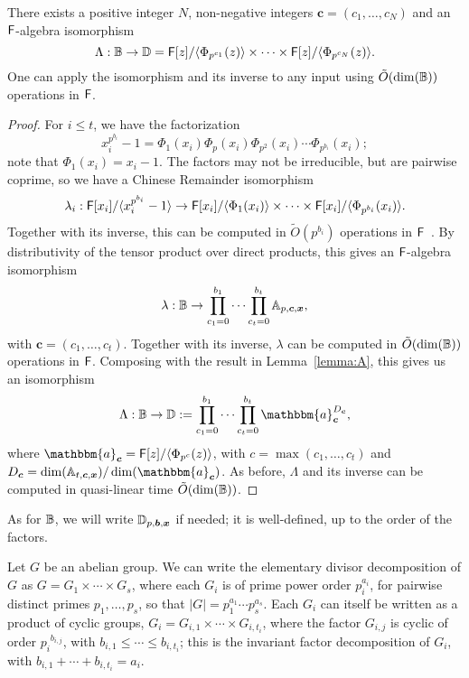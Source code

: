 \begin{lemma}\label{lemma:alg}
  There exists a positive integer $N$, non-negative integers
  $\boldsymbol{c}=(c_1,\dots,c_N)$ and  an
  ${\mathsf{F}}$-algebra isomorphism 
  $$\Lambda: \mathbb{B} \to \mathbb{D}= {\mathsf{F}}[z]/\langle \Phi_{p^{c_1}}(z) \rangle \times \cdots \times {\mathsf{F}}[z]/\langle \Phi_{p^{c_N}}(z)\rangle.$$
  One can apply the isomorphism and its inverse to any 
  input using $\tilde{O}(\dim(\mathbb{B}))$ operations in ${\mathsf{F}}$.
\end{lemma}
\begin{proof}
For $i \le t$, we have the factorization
$$x_i^{p^{b_i}}-1 = \Phi_1(x_i) \Phi_p(x_i) \Phi_{p^2}(x_i) \cdots
\Phi_{p^{b_i}}(x_i);$$ note that $\Phi_1(x_i)=x_i-1$.  The factors may
not be irreducible, but are pairwise coprime, so we have a
Chinese Remainder isomorphism
\[
  \lambda_i: {\mathsf{F}}[x_i]/\langle x_i^{p^{b_i}}-1 \rangle \to {\mathsf{F}}[x_i]/\langle \Phi_1(x_i)\rangle
  \times \cdots \times  {\mathsf{F}}[x_i]/\langle \Phi_{p^{b_i}}(x_i)\rangle.
\]
Together with its inverse, this can be computed  
in $\tilde{O}(p^{b_i})$ operations in ${\mathsf{F}}$~\cite[Chapter~10]{vzGathen13}. By distributivity of the tensor
product over direct products, 
this gives an ${\mathsf{F}}$-algebra isomorphism
$$\lambda: \mathbb{B} \to \prod_{c_1=0}^{b_1} \cdots \prod_{c_t=0}^{b_t} \mathbb{A}_{p,\boldsymbol{c},\boldsymbol{x}},$$
with $\boldsymbol{c}=(c_1,\dots,c_t)$. Together with its inverse, 
$\lambda$ can be computed in $\tilde{O}(\dim(\mathbb{B}))$ operations in ${\mathsf{F}}$.
Composing with the result in Lemma~\ref{lemma:A}, this gives
us an isomorphism
$$\Lambda: \B \to \D:=\prod_{c_1=0}^{b_1} \cdots \prod_{c_t=0}^{b_t}
\mathbbm{a}_{\boldsymbol{c}}^{D_{\boldsymbol{c}}},$$ where
$\mathbbm{a}_{\boldsymbol{c}} = \F[z]/\langle \Phi_{p^c}(z)\rangle$,
with $c =\max(c_1,\dots,c_t)$ and $D_{\boldsymbol{c}} =
\dim(\A_{t,\boldsymbol{c},\boldsymbol{x}})/\dim(\mathbbm{a}_{\boldsymbol{c}})$. As
before, $\Lambda$ and its inverse can be computed in quasi-linear time
$\tilde{O}(\dim(\mathbb{B}))$.
\end{proof}
As for $\mathbb{B}$, we will write $\mathbb{D}_{p,\boldsymbol{b},\boldsymbol{x}}$ if needed; it is
well-defined, up to the order of the factors.

\smallskip

 Let $G$ be an abelian group.  We can
write the elementary divisor decomposition of $G$ as $G = G_1 \times
\cdots \times G_s$, where each $G_i$ is of prime power order
$p_i^{a_i}$, for pairwise distinct primes $p_1,\dots,p_s$, so that
$|G| = p_1^{a_1} \cdots p_s^{a_s}$. Each $G_i$ can itself be written
as a product of cyclic groups, $G_i = G_{i,1} \times \cdots \times
G_{i,t_i}$, where the factor $G_{i,j}$ is cyclic of order
${p_i}^{b_{i,j}}$, with $b_{i,1} \le \cdots \le b_{i,t_i}$; this is
the invariant factor decomposition of $G_i$, with $b_{i,1} + \cdots +
b_{i,t_i} = a_i$.

